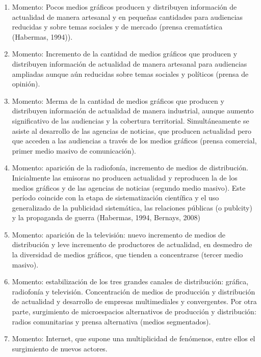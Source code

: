 \begin{enumerate} [label=\arabic*{\textsuperscript{°}}]
	\item Momento: Pocos medios gráficos producen y distribuyen información de actualidad de manera artesanal y en pequeñas cantidades para audiencias reducidas y sobre temas sociales y de mercado (prensa crematística (Habermas, 1994)).
	\item Momento: Incremento de la cantidad de medios gráficos que producen y distribuyen información de actualidad de manera artesanal para audiencias ampliadas aunque aún reducidas sobre temas sociales y políticos (prensa de opinión).
	\item Momento: Merma de la cantidad de medios gráficos que producen y distribuyen información de actualidad de manera industrial, aunque aumento significativo de las audiencias y la cobertura territorial. Simultáneamente se asiste al desarrollo de las agencias de noticias, que producen actualidad pero que acceden a las audiencias a través de los medios gráficos (prensa comercial, primer medio masivo de comunicación).
	\item Momento: aparición de la radiofonía, incremento de medios de distribución. Inicialmente las emisoras no producen actualidad y reproducen la de los medios gráficos y de las agencias de noticias (segundo medio masivo). Este período coincide con la etapa de sistematización científica y el uso generalizado de la publicidad sistemática, las relaciones públicas (o publcity) y la propaganda de guerra (Habermas, 1994, Bernays, 2008)
	\item Momento: aparición de la televisión: nuevo incremento de medios de distribución y leve incremento de productores de actualidad, en desmedro de la diversidad de medios gráficos, que tienden a concentrarse (tercer medio masivo).
	\item Momento: estabilización de los tres grandes canales de distribución: gráfica, radiofonía y televisión. Concentración de medios de producción y distribución de actualidad y desarrollo de empresas multimediales y convergentes. Por otra parte, surgimiento de microespacios alternativos de producción y distribución: radios comunitarias y prensa alternativa (medios segmentados).
	\item Momento: Internet, que supone una multiplicidad de fenómenos, entre ellos el surgimiento de nuevos actores.
\end{enumerate}


